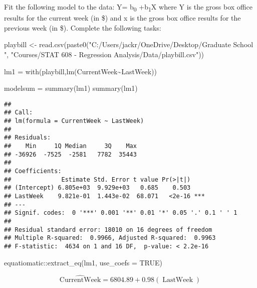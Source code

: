 \documentclass[
]{article}
\newenvironment{Shaded}{\begin{snugshade}}{\end{snugshade}}
\newcommand{\AttributeTok}[1]{\textcolor[rgb]{0.77,0.63,0.00}{#1}}
\newcommand{\ConstantTok}[1]{\textcolor[rgb]{0.00,0.00,0.00}{#1}}
\newcommand{\FunctionTok}[1]{\textcolor[rgb]{0.00,0.00,0.00}{#1}}
\newcommand{\NormalTok}[1]{#1}
\newcommand{\OtherTok}[1]{\textcolor[rgb]{0.56,0.35,0.01}{#1}}
\newcommand{\SpecialCharTok}[1]{\textcolor[rgb]{0.00,0.00,0.00}{#1}}
\newcommand{\StringTok}[1]{\textcolor[rgb]{0.31,0.60,0.02}{#1}}
\begin{document}
Fit the following model to the data: Y= b\textsubscript{0}
+b\textsubscript{1}X where Y is the gross box office results for the
current week (in \$) and x is the gross box office results for the
previous week (in \$). Complete the following tasks:

\begin{Shaded}
\begin{Highlighting}[]
\NormalTok{playbill }\OtherTok{\textless{}{-}} \FunctionTok{read.csv}\NormalTok{(}\FunctionTok{paste0}\NormalTok{(}\StringTok{"C:/Users/jackr/OneDrive/Desktop/Graduate School "}\NormalTok{,}
                     \StringTok{"Courses/STAT 608 {-} Regression Analysis/Data/playbill.csv"}\NormalTok{))}

\NormalTok{lm1 }\OtherTok{=} \FunctionTok{with}\NormalTok{(playbill,}\FunctionTok{lm}\NormalTok{(CurrentWeek}\SpecialCharTok{\textasciitilde{}}\NormalTok{LastWeek))}

\NormalTok{modelsum }\OtherTok{=} \FunctionTok{summary}\NormalTok{(lm1)}
\FunctionTok{summary}\NormalTok{(lm1)}
\end{Highlighting}
\end{Shaded}

\begin{verbatim}
## 
## Call:
## lm(formula = CurrentWeek ~ LastWeek)
## 
## Residuals:
##    Min     1Q Median     3Q    Max 
## -36926  -7525  -2581   7782  35443 
## 
## Coefficients:
##              Estimate Std. Error t value Pr(>|t|)    
## (Intercept) 6.805e+03  9.929e+03   0.685    0.503    
## LastWeek    9.821e-01  1.443e-02  68.071   <2e-16 ***
## ---
## Signif. codes:  0 '***' 0.001 '**' 0.01 '*' 0.05 '.' 0.1 ' ' 1
## 
## Residual standard error: 18010 on 16 degrees of freedom
## Multiple R-squared:  0.9966, Adjusted R-squared:  0.9963 
## F-statistic:  4634 on 1 and 16 DF,  p-value: < 2.2e-16
\end{verbatim}

\begin{Shaded}
\begin{Highlighting}[]
\NormalTok{equatiomatic}\SpecialCharTok{::}\FunctionTok{extract\_eq}\NormalTok{(lm1, }\AttributeTok{use\_coefs =} \ConstantTok{TRUE}\NormalTok{)}
\end{Highlighting}
\end{Shaded}

\begin{equation}
\operatorname{\widehat{CurrentWeek}} = 6804.89 + 0.98(\operatorname{LastWeek})
\end{equation}
\end{document}
